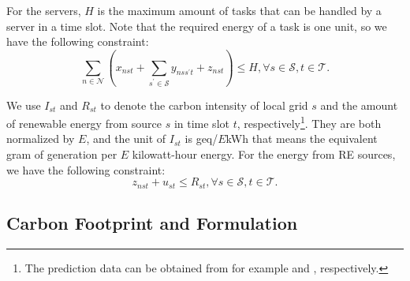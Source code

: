 \documentclass[conference, 10pt, ﬁnal, letterpaper, twocolumn]{IEEEtran}
\begin{document}
For the servers, $H$ is the maximum amount of tasks that can be handled by a server in a time slot. Note that the required energy of a task is one unit, so we have the following constraint:
\begin{equation}\label{c4}
    \sum_{n \in \mathcal{N}}(x_{nst}+\sum_{s^\prime \in\mathcal{S}} y_{nss^\prime t} +z_{nst}) \leq H, \forall s \in \mathcal{S}, t \in \mathcal{T}.
\end{equation}

We use $I_{st}$ and $R_{st}$ to denote the carbon intensity of local grid $s$ and the amount of renewable energy from source $s$ in time slot $t$, respectively\footnote{The prediction data can be obtained from for example \cite{ElectricityMaps} and \cite{li2019renewable}, respectively.}. They are both normalized by $E$, and the unit of $I_{st}$ is geq/$E$kWh that means the equivalent gram of  generation per $E$ kilowatt-hour energy. For the energy from RE sources, we have the following constraint:
\begin{equation}\label{c5}
    z_{nst} + u_{st} \leq R_{st}, \forall s \in \mathcal{S}, t \in \mathcal{T}.
\end{equation}

\subsection{Carbon Footprint and Formulation} \label{subsec:CFA}
\end{document}
